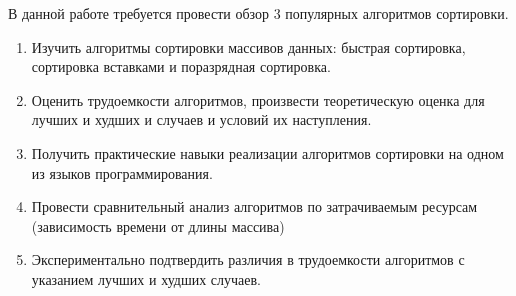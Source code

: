 \Introduction

	
	В данной работе требуется провести обзор 3 популярных алгоритмов сортировки. 
	\begin{enumerate}
		\item Изучить алгоритмы сортировки массивов данных: быстрая сортировка, сортировка вставками и поразрядная сортировка. 
		\item Оценить трудоемкости алгоритмов, произвести теоретическую оценка для лучших и худших и случаев и условий их наступления. 
		\item Получить практические навыки реализации алгоритмов сортировки на одном из языков программирования. 
		\item Провести сравнительный анализ алгоритмов по затрачиваемым ресурсам (зависимость времени от длины массива)
		\item Экспериментально подтвердить различия в трудоемкости алгоритмов с указанием лучших и худших случаев. 
	\end{enumerate}
